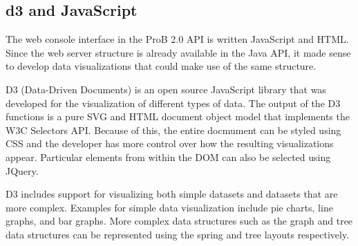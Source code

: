 \subsection{d3 and JavaScript}

The web console interface in the ProB 2.0 API is written JavaScript and HTML. Since the web server structure is already available in the Java API, it made sense to develop data visualizations that could make use of the same structure. 

D3 (Data-Driven Documents) is an open source JavaScript library that was developed for the visualization of different types of data. The output of the D3 functions is a pure SVG and HTML document object model that implements the W3C Selectors API. Because of this, the entire docmument can be styled using CSS and the developer has more control over how the resulting visualizations appear. Particular elements from within the DOM can also be selected using JQuery. 

D3 includes support for visualizing both simple datasets and datasets that are more complex. Examples for simple data visualization include pie charts, line graphs, and bar graphs. More complex data structures such as the graph and tree data structures can be represented using the spring and tree layouts respectively.